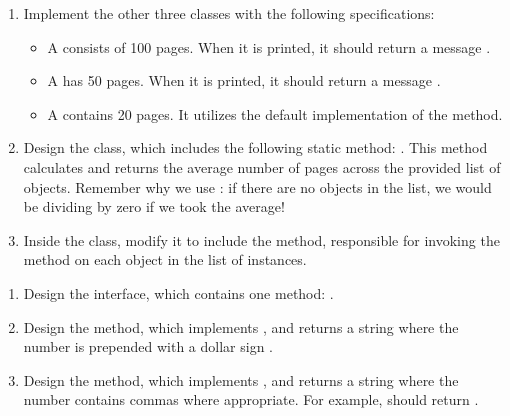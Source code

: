 \begin{enumerate}[label=(\alph*)]
\item Implement the other three classes with the following specifications:
\begin{itemize}
\item A  consists of 100 pages. When it is printed, it should return a message .
\item A  has 50 pages. When it is printed, it should return a message .
\item A  contains 20 pages. It utilizes the default implementation of the  method.
\end{itemize}
\item Design the  class, which includes the following static method: . This method calculates and returns the average number of pages across the provided list of  objects. Remember why we use : if there are no  objects in the list, we would be dividing by zero if we took the average! 
\item Inside the  class, modify it to include the  method, responsible for invoking the  method on each object in the list of  instances.
\end{enumerate}

\begin{enumerate}[label=(\alph*)]
  \item Design the  interface, which contains one method: . 
  \item Design the  method, which implements , and returns a string where the number is prepended with a dollar sign .
  \item Design the  method, which implements , and returns a string where the number contains commas where appropriate. For example,  should return .
\end{enumerate}

